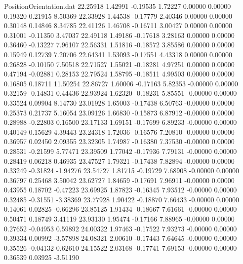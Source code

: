 \begin{filecontents}{PositionOrientation.dat}
  22.25918    1.42991   -0.19535     1.72227    0.00000    0.00000    0.19320    0.21915    8.50369
  22.33928    1.44538   -0.17779     2.40346    0.00000    0.00000    0.30148    0.14846    8.34785
  22.41126    1.46708   -0.16711     3.00427    0.00000    0.00000    0.31001   -0.11350    3.47037
  22.49118    1.49186   -0.17618     3.28163    0.00000    0.00000    0.36460   -0.13227    7.96107
  22.56331    1.51816   -0.18572     3.85586    0.00000    0.00000    0.15949    0.12739    7.20706
  22.64341    1.53093   -0.17551     4.43318    0.00000    0.00000    0.26828   -0.10150    7.50518
  22.71527    1.55021   -0.18281     4.97251    0.00000    0.00000    0.47194   -0.02881    0.28153
  22.79524    1.58795   -0.18511     4.99503    0.00000    0.00000    0.16805    0.18711   11.50254
  22.86727    1.60006   -0.17163     5.82353   -0.00000    0.00000    0.32159   -0.14831    0.44436
  22.93924    1.62320   -0.18231     5.85551   -0.00000    0.00000    0.33524    0.09904    8.14730
  23.01928    1.65003   -0.17438     6.50763   -0.00000    0.00000    0.25373    0.21737    5.16054
  23.09126    1.66830   -0.15873     6.87912   -0.00000    0.00000    0.28988   -0.22803    0.16500
  23.17133    1.69151   -0.17699     6.89233   -0.00000    0.00000    0.40149    0.15629    4.39443
  23.24318    1.72036   -0.16576     7.20810   -0.00000    0.00000    0.36957    0.02450    2.09355
  23.32305    1.74987   -0.16380     7.37530   -0.00000    0.00000    0.28531   -0.21599    5.77471
  23.39509    1.77042   -0.17936     7.79131   -0.00000    0.00000    0.28419    0.06218    0.46935
  23.47527    1.79321   -0.17438     7.82894   -0.00000    0.00000    0.33249   -0.31824   -1.94276
  23.54727    1.81715   -0.19729     7.68908   -0.00000    0.00000    0.36797    0.25468    3.50042
  23.62727    1.84659   -0.17691     7.96911   -0.00000    0.00000    0.43955    0.18702   -0.47223
  23.69925    1.87823   -0.16345     7.93512   -0.00000    0.00000    0.32485   -0.31551   -3.38369
  23.77928    1.90422   -0.18870     7.66433   -0.00000    0.00000    0.14061    0.02825   -0.66296
  23.85125    1.91434   -0.18667     7.61661   -0.00000    0.00000    0.50471    0.18749    3.41119
  23.93130    1.95474   -0.17166     7.88965   -0.00000    0.00000    0.27652   -0.04953    0.59892
  24.00322    1.97463   -0.17522     7.93273   -0.00000    0.00000    0.39334    0.00992   -3.57898
  24.08321    2.00610   -0.17443     7.64645   -0.00000    0.00000    0.35526   -0.04132    0.62610
  24.15522    2.03168   -0.17741     7.69153   -0.00000    0.00000    0.36539    0.03925   -3.51190

\end{filecontents}
